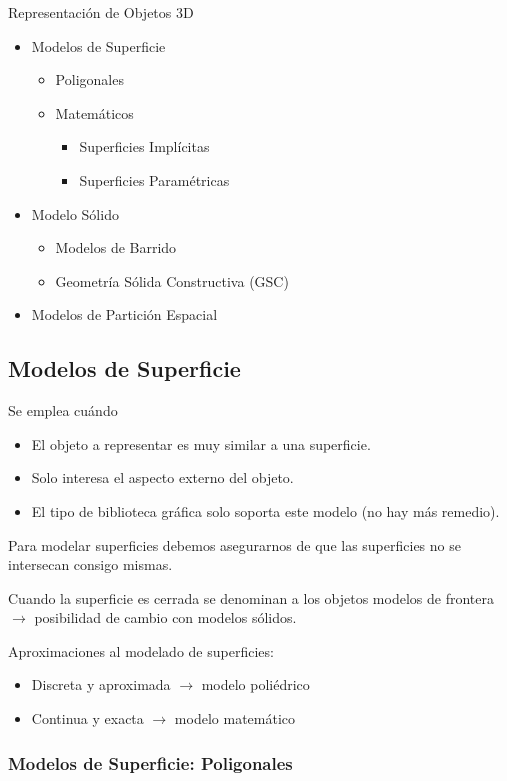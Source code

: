 Representación de Objetos 3D
\begin{itemize}
    \item Modelos de Superficie
    \begin{itemize}
        \item Poligonales
        \item Matemáticos
        \begin{itemize}
            \item Superficies Implícitas
            \item Superficies Paramétricas
        \end{itemize}
    \end{itemize}
    \item Modelo Sólido
    \begin{itemize}
        \item Modelos de Barrido
        \item Geometría Sólida Constructiva (GSC)
    \end{itemize}
    \item Modelos de Partición Espacial
\end{itemize}

\subsection{Modelos de Superficie}
Se emplea cuándo
\begin{itemize}
    \item El objeto a representar es muy similar a una superficie.
    \item Solo interesa el aspecto externo del objeto.
    \item El tipo de biblioteca gráfica solo soporta este modelo (no hay más remedio).
\end{itemize}

Para modelar superficies debemos asegurarnos de que las superficies no se intersecan consigo mismas.

Cuando la superficie es cerrada se denominan a los objetos modelos de frontera $\rightarrow$ posibilidad de cambio con modelos sólidos.

Aproximaciones al modelado de superficies:
\begin{itemize}
    \item Discreta y aproximada $\rightarrow$ modelo poliédrico
    \item Continua y exacta $\rightarrow$ modelo matemático
\end{itemize}

\subsubsection{Modelos de Superficie: Poligonales}
